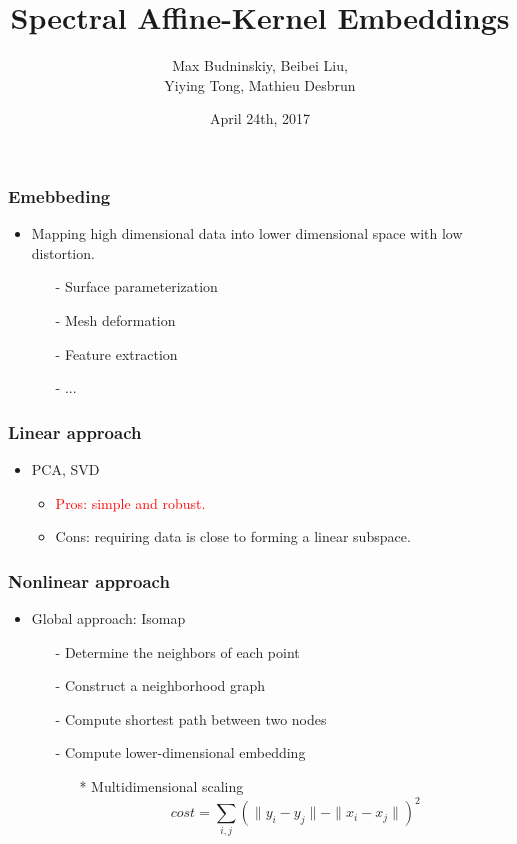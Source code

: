 \documentclass[serif,mathserif, 12pt]{beamer}
\title[\hspace{2em}\insertframenumber/\inserttotalframenumber]{Spectral Affine-Kernel Embeddings}
\date{April 24th, 2017}
\author{Max Budninskiy, Beibei Liu,\\ Yiying Tong, Mathieu Desbrun}
\begin{document}
\maketitle

\begin{frame}
  \frametitle{Emebbeding}
  \begin{itemize}
  \item Mapping high dimensional data into lower dimensional space with
    low distortion.
    \begin{itemize}
    \item[-] Surface parameterization
    \item[-] Mesh deformation
    \item[-] Feature extraction
    \item[-] ...
    \end{itemize}
  \end{itemize}
\end{frame}

\begin{frame}
  \frametitle{Linear approach}
  \begin{itemize}
  \item PCA, SVD
    \begin{itemize}
    \item \textcolor{red}{Pros: simple and robust.}
    \item \textcolor{green!50!black}{Cons: requiring data is close to forming a linear subspace.}
    \end{itemize}
  \end{itemize}
\end{frame}

\begin{frame}
  \frametitle{Nonlinear approach}
  \begin{itemize}
  \item Global approach: Isomap
    \begin{itemize}
    \item[-] Determine the neighbors of each point
    \item[-] Construct a neighborhood graph
    \item[-] Compute shortest path between two nodes
    \item[-] Compute lower-dimensional embedding
      \begin{itemize}
      \item[*] Multidimensional scaling
        \begin{equation*}
          cost = \sum_{i, j} (\|y_i-y_j\|-\|x_i-x_j\|)^2
        \end{equation*}
      \end{itemize}
    \end{itemize}
  \end{itemize}
\end{frame}
\end{document}
